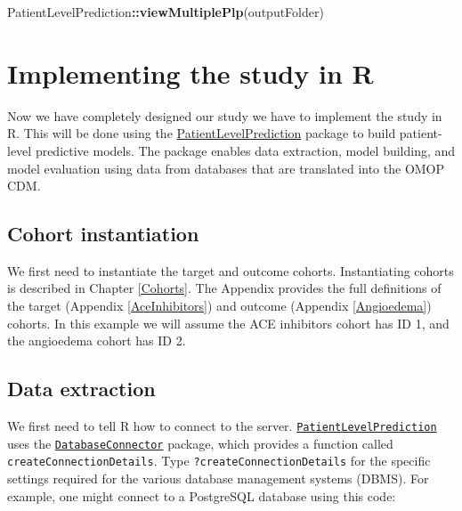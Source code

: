 \documentclass[11pt]{book}
\newenvironment{Shaded}{\begin{snugshade}}{\end{snugshade}}
\newcommand{\KeywordTok}[1]{\textcolor[rgb]{0.13,0.29,0.53}{\textbf{#1}}}
\newcommand{\OperatorTok}[1]{\textcolor[rgb]{0.81,0.36,0.00}{\textbf{#1}}}
\newcommand{\NormalTok}[1]{#1}
\begin{document}
\begin{Shaded}
\begin{Highlighting}[]
\NormalTok{PatientLevelPrediction}\OperatorTok{::}\KeywordTok{viewMultiplePlp}\NormalTok{(outputFolder)}
\end{Highlighting}
\end{Shaded}

\newpage

\section{Implementing the study in R}\label{implementing-the-study-in-r}

Now we have completely designed our study we have to implement the study
in R. This will be done using the
\href{https://ohdsi.github.io/PatientLevelPrediction/}{PatientLevelPrediction}
package to build patient-level predictive models. The package enables
data extraction, model building, and model evaluation using data from
databases that are translated into the OMOP CDM.

\subsection{Cohort instantiation}\label{cohort-instantiation-1}

We first need to instantiate the target and outcome cohorts.
Instantiating cohorts is described in Chapter \ref{Cohorts}. The
Appendix provides the full definitions of the target (Appendix
\ref{AceInhibitors}) and outcome (Appendix \ref{Angioedema}) cohorts. In
this example we will assume the ACE inhibitors cohort has ID 1, and the
angioedema cohort has ID 2.

\subsection{Data extraction}\label{data-extraction-1}

We first need to tell R how to connect to the server.
\href{https://ohdsi.github.io/PatientLevelPrediction/}{\texttt{PatientLevelPrediction}}
uses the
\href{https://ohdsi.github.io/DatabaseConnector/}{\texttt{DatabaseConnector}}
package, which provides a function called
\texttt{createConnectionDetails}. Type \texttt{?createConnectionDetails}
for the specific settings required for the various database management
systems (DBMS). For example, one might connect to a PostgreSQL database
using this code:
\end{document}

